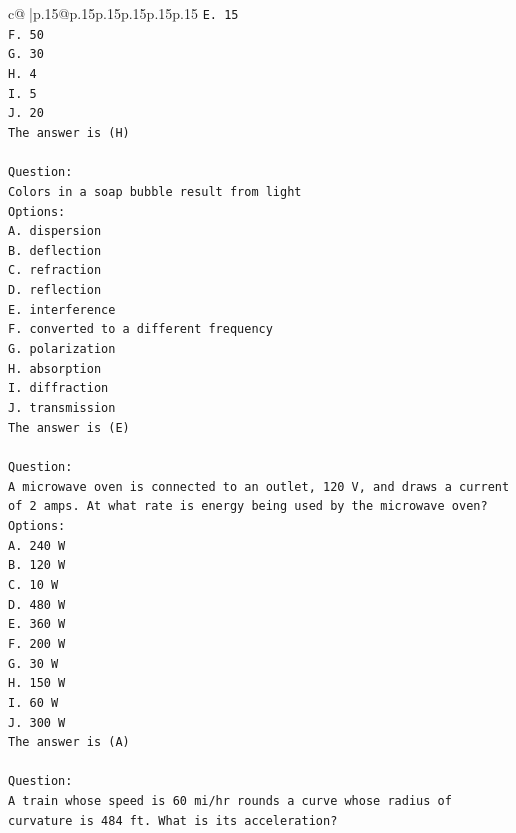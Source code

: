 \documentclass{article}
\begin{document}
{\begin{supertabular}{c@{$\;$}|p{.15\linewidth}@{}p{.15\linewidth}p{.15\linewidth}p{.15\linewidth}p{.15\linewidth}p{.15\linewidth}}
{{{\texttt{E. 15} \\
\texttt{F. 50} \\
\texttt{G. 30} \\
\texttt{H. 4} \\
\texttt{I. 5} \\
\texttt{J. 20} \\
\texttt{The answer is (H)} \\
\\ 
\texttt{Question:} \\
\texttt{Colors in a soap bubble result from light} \\
\texttt{Options:} \\
\texttt{A. dispersion} \\
\texttt{B. deflection} \\
\texttt{C. refraction} \\
\texttt{D. reflection} \\
\texttt{E. interference} \\
\texttt{F. converted to a different frequency} \\
\texttt{G. polarization} \\
\texttt{H. absorption} \\
\texttt{I. diffraction} \\
\texttt{J. transmission} \\
\texttt{The answer is (E)} \\
\\ 
\texttt{Question:} \\
\texttt{A microwave oven is connected to an outlet, 120 V, and draws a current of 2 amps. At what rate is energy being used by the microwave oven?} \\
\texttt{Options:} \\
\texttt{A. 240 W} \\
\texttt{B. 120 W} \\
\texttt{C. 10 W} \\
\texttt{D. 480 W} \\
\texttt{E. 360 W} \\
\texttt{F. 200 W} \\
\texttt{G. 30 W} \\
\texttt{H. 150 W} \\
\texttt{I. 60 W} \\
\texttt{J. 300 W} \\
\texttt{The answer is (A)} \\
\\ 
\texttt{Question:} \\
\texttt{A train whose speed is 60 mi/hr rounds a curve whose radius of curvature is 484 ft. What is its acceleration?} \\
}}}
\end{supertabular}}
\end{document}
